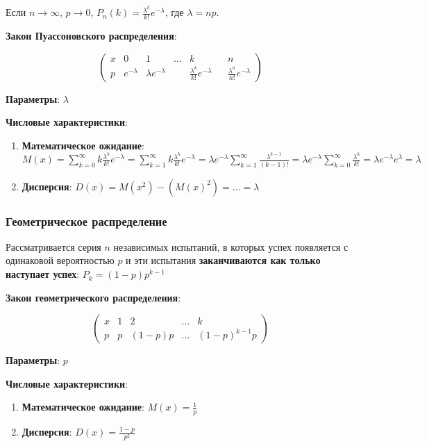 \documentclass{article}
\begin{document}
Если $n \to \infty$, $p \to 0$, $P_n(k) = \frac{\lambda^k}{k!} e^{-\lambda}$, где $\lambda = np$.

\textbf{Закон Пуассоновского распределения}:

$$
\begin{pmatrix}
  x & 0 & 1 & \dots & k & & n \\
  p & e^{-\lambda} & \lambda e^{-\lambda} & & \frac{\lambda^{k}}{k!} e^{-\lambda} & & \frac{\lambda^{n}}{n!} e^{-\lambda}
\end{pmatrix}
$$

\textbf{Параметры}: $\lambda$

\textbf{Числовые характеристики}:

\begin{enumerate}
    \item \textbf{Математическое ожидание}:
    $M(x) = \sum\limits_{k = 0}^{\infty} k \frac{\lambda^{k}}{k!} e^{-\lambda} = \sum\limits_{k = 1}^{\infty} k \frac{\lambda^{k}}{k!} e^{-\lambda} = \lambda e^{-\lambda} \sum\limits_{k = 1}^{\infty} \frac{\lambda^{k - 1}}{(k - 1)!} = \lambda e^{-\lambda} \sum\limits_{k = 0}^{\infty} \frac{\lambda^{k}}{k!} = \lambda e^{-\lambda} e^{\lambda} = \lambda$
    \item \textbf{Дисперсия}:
    $D(x) = M(x^2) - (M(x)^2)=\dots=\lambda$
\end{enumerate}

\subsubsection{Геометрическое распределение}

Рассматривается серия $n$ независимых испытаний, в которых успех появляется с одинаковой вероятностью $p$ и эти испытания \textbf{заканчиваются как только наступает успех}: $P_{k} = (1-p)p^{k - 1}$

\textbf{Закон геометрического распределения}:

$$
\begin{pmatrix}
    x & 1 & 2 & \dots & k \\
    p & p & (1-p)p & \dots & (1-p)^{k - 1}p
\end{pmatrix}
$$

\textbf{Параметры}: $p$

\textbf{Числовые характеристики}:

\begin{enumerate}
    \item \textbf{Математическое ожидание}: $M(x) = \frac{1}{p}$
    \item \textbf{Дисперсия}: $D(x) = \frac{1-p}{p^2}$
\end{enumerate}
\end{document}
